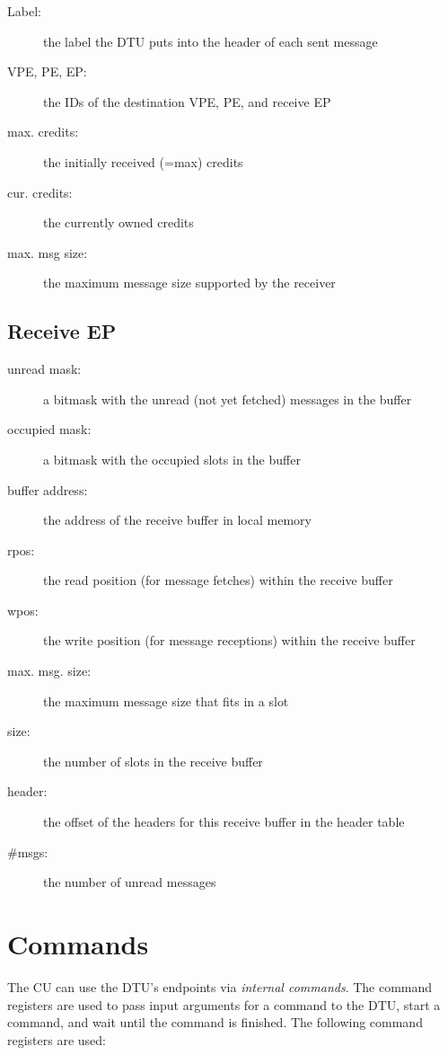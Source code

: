 \documentclass[a4paper,11pt,draft]{article}
\begin{document}
\begin{description}
  \item[Label:] the label the DTU puts into the header of each sent message
  \item[VPE, PE, EP:] the IDs of the destination VPE, PE, and receive EP
  \item[max. credits:] the initially received (=max) credits
  \item[cur. credits:] the currently owned credits
  \item[max. msg size:] the maximum message size supported by the receiver
\end{description}

\subsection{Receive EP}

\begin{description}
  \item[unread mask:] a bitmask with the unread (not yet fetched) messages in the buffer
  \item[occupied mask:] a bitmask with the occupied slots in the buffer
  \item[buffer address:] the address of the receive buffer in local memory
  \item[rpos:] the read position (for message fetches) within the receive buffer
  \item[wpos:] the write position (for message receptions) within the receive buffer
  \item[max. msg. size:] the maximum message size that fits in a slot
  \item[size:] the number of slots in the receive buffer
  \item[header:] the offset of the headers for this receive buffer in the header table
  \item[\#msgs:] the number of unread messages
\end{description}

\section{Commands}

The CU can use the DTU's endpoints via \emph{internal commands}. The command registers are used to
pass input arguments for a command to the DTU, start a command, and wait until the command is
finished. The following command registers are used:
\end{document}
